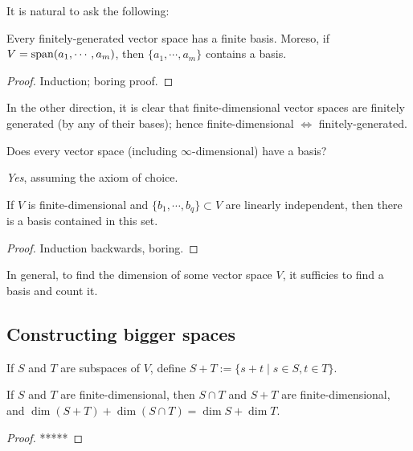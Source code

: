 It is natural to ask the following:

\begin{theorem}
  Every finitely-generated vector space has a finite basis. Moreso, if $V=\operatorname{span}(a_1,\cdots,a_m)$, then $\{a_1,\cdots,a_m\}$ contains a basis.
\end{theorem}
\begin{proof}
  Induction; boring proof.
\end{proof}

In the other direction, it is clear that finite-dimensional vector spaces are finitely generated (by any of their bases); hence finite-dimensional $\Longleftrightarrow$ finitely-generated.

\begin{question}
  Does every vector space (including $\infty$-dimensional) have a basis?
\end{question}
\begin{answer}
  \emph{Yes}, assuming the axiom of choice.
\end{answer}


\begin{theorem}
  If $V$ is finite-dimensional and $\{b_1,\cdots,b_q\}\subset V$ are linearly independent, then there is a basis contained in this set.
\end{theorem}
\begin{proof}
  Induction backwards, boring.
\end{proof}



In general, to find the dimension of some vector space $V$, it sufficies to find a basis and count it.

\subsection{Constructing bigger spaces}
If $S$ and $T$ are subspaces of $V$, define $S+T:=\{s+t \mid s\in S, t\in T\}$.

\begin{theorem}
  If $S$ and $T$ are finite-dimensional, then $S\cap T$ and $S+T$ are finite-dimensional, and $\dim(S+T)+\dim(S\cap T) = \dim S + \dim T$.
\end{theorem}
\begin{proof}
  *****
\end{proof}
